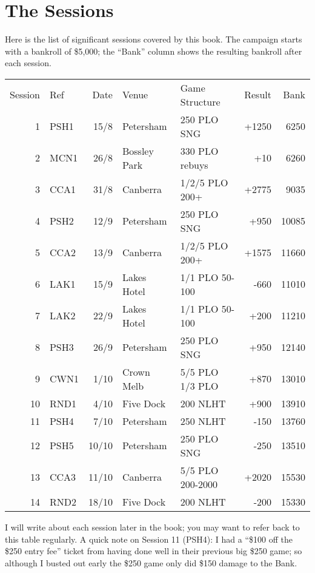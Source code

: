 \chapter{The Sessions}

Here is the list of significant sessions covered by this book. The
campaign starts with a bankroll of \$5,000; the ``Bank'' column shows
the resulting bankroll after each session.

\begin{tabular}{rlrllrr}
 Session & Ref & Date & Venue & Game Structure & Result & Bank \\
  1  &   PSH1    & 15/8 & Petersham & 250 PLO SNG & +1250 & 6250 \\
  2  &   MCN1    & 26/8 & Bossley Park & 330 PLO rebuys & +10 & 6260 \\
  3  &   CCA1    & 31/8 & Canberra  & 1/2/5 PLO 200+ & +2775 & 9035 \\
  4  &   PSH2    & 12/9 & Petersham & 250 PLO SNG & +950 & 10085 \\
  5  &   CCA2    & 13/9 & Canberra  & 1/2/5 PLO 200+ & +1575 & 11660 \\
  6  &   LAK1    & 15/9 & Lakes Hotel & 1/1 PLO 50-100 & -660 & 11010 \\
  7  &   LAK2    & 22/9 & Lakes Hotel & 1/1 PLO 50-100 & +200 & 11210 \\
  8  &   PSH3    & 26/9 & Petersham & 250 PLO SNG & +950 & 12140 \\
  9  &   CWN1    & 1/10 & Crown Melb & 5/5 PLO 1/3 PLO & +870 & 13010 \\
 10  &   RND1    & 4/10 & Five Dock & 200 NLHT & +900 & 13910 \\
 11  &   PSH4    & 7/10 & Petersham & 250 NLHT & -150 & 13760 \\
 12  &   PSH5    & 10/10 & Petersham & 250 PLO SNG & -250 & 13510 \\
 13  &   CCA3    & 11/10 & Canberra  & 5/5 PLO 200-2000 & +2020 & 15530 \\
 14  &   RND2    & 18/10 & Five Dock & 200 NLHT & -200 & 15330 \\
\end{tabular}

I will write about each session later in the book; you may want to
refer back to this table regularly. A quick note on Session 11 (PSH4): I had
a ``\$100 off the \$250 entry fee'' ticket from having done well in
their previous big \$250 game; so although I busted out early the \$250
game only did \$150 damage to the Bank.
